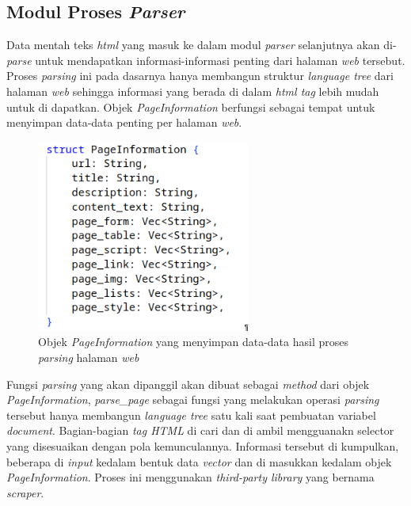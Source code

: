 \subsection{Modul Proses \emph{Parser}}

Data mentah teks \emph{html} yang masuk ke dalam modul \emph{parser} selanjutnya akan di-\emph{parse} untuk mendapatkan informasi-informasi penting dari halaman \emph{web} tersebut. Proses \emph{parsing} ini pada dasarnya hanya membangun struktur \emph{language tree} dari halaman \emph{web} sehingga informasi yang berada di dalam \emph{html tag} lebih mudah untuk di dapatkan. Objek \emph{PageInformation} berfungsi sebagai tempat untuk menyimpan data-data penting per halaman \emph{web}.

\begin{figure}[H]
	\centering
	\includegraphics[keepaspectratio, width=7cm]{gambar/parse-object-rs.png}
  \caption{Objek \emph{PageInformation} yang menyimpan data-data hasil proses \emph{parsing} halaman \emph{web}}
	\label{gambar:parse_object}
\end{figure}

Fungsi \emph{parsing} yang akan dipanggil akan dibuat sebagai \emph{method} dari objek \emph{PageInformation}, \emph{parse\_page} sebagai fungsi yang melakukan operasi \emph{parsing} tersebut hanya membangun \emph{language tree} satu kali saat pembuatan variabel \emph{document}. Bagian-bagian \emph{tag HTML} di cari dan di ambil mengguanakn selector yang disesuaikan dengan pola kemunculannya. Informasi tersebut di kumpulkan, beberapa di \emph{input} kedalam bentuk data \emph{vector} dan di masukkan kedalam objek \emph{PageInformation}. Proses ini menggunakan \emph{third-party library} yang bernama \emph{scraper}.

